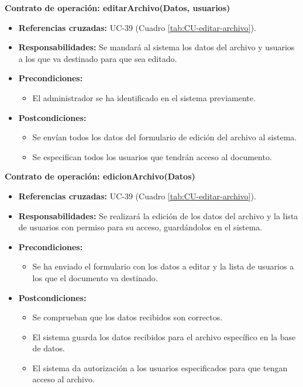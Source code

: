 \textbf{Contrato de operación: editarArchivo(Datos, usuarios)}
\begin{itemize}
\item \textbf{Referencias cruzadas:} UC-39 (Cuadro \ref{tab:CU-editar-archivo}).
\item \textbf{Responsabilidades:} Se mandará al sistema los datos del archivo y usuarios a los que va destinado para que sea editado.
\item \textbf{Precondiciones:} 
 \begin{itemize}
\item El administrador se ha identificado en el sistema previamente.
\end {itemize}
\item \textbf{Postcondiciones:} 
 \begin{itemize}
\item Se envían todos los datos del formulario de edición del archivo al sistema.
\item Se especifican todos los usuarios que tendrán acceso al documento.
\end {itemize}
\end {itemize}

\textbf{Contrato de operación: edicionArchivo(Datos)}
\begin{itemize}
\item \textbf{Referencias cruzadas:} UC-39 (Cuadro \ref{tab:CU-editar-archivo}).
\item \textbf{Responsabilidades:} Se realizará la edición de los datos del archivo y la lista de usuarios con permiso para su acceso, guardándolos en el sistema.
\item \textbf{Precondiciones:} 
 \begin{itemize}
\item Se ha enviado el formulario con los datos a editar y la lista de usuarios a los que el documento va destinado.
\end {itemize}
\item \textbf{Postcondiciones:} 
 \begin{itemize}
 \item Se comprueban que los datos recibidos son correctos.
\item El sistema guarda los datos recibidos para el archivo específico en la base de datos.
\item El sistema da autorización a los usuarios especificados para que tengan acceso al archivo.
\end {itemize}
\end {itemize}

